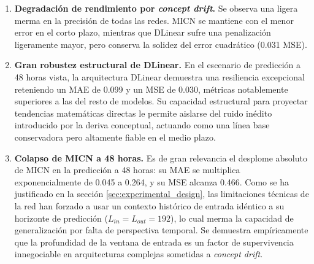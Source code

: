 \begin{enumerate}
	\item \textbf{Degradación de rendimiento por \textit{concept drift}.}
	Se observa  una ligera merma en la  precisión de todas las redes. MICN se mantiene con el menor error en el corto plazo, mientras que DLinear sufre una penalización ligeramente mayor, pero conserva la solidez del error cuadrático (0.031 MSE).
	
	\item \textbf{Gran robustez estructural de DLinear.}
	En el escenario de predicción a 48 horas vista, la arquitectura DLinear demuestra una resiliencia excepcional reteniendo un MAE de 0.099 y un MSE de 0.030, métricas notablemente superiores a las del resto de modelos. Su capacidad estructural para proyectar tendencias matemáticas directas le permite aislarse del ruido inédito introducido por la deriva conceptual, actuando como una línea base conservadora pero altamente fiable en el medio plazo. 
	
	\item \textbf{Colapso de MICN a 48 horas.}
	Es de gran relevancia el desplome absoluto de MICN en la predicción a 48 horas: su MAE se multiplica exponencialmente de 0.045 a 0.264, y su MSE alcanza 0.466. Como se ha justificado en la sección \ref{sec:experimental_design}, las limitaciones técnicas de la red han forzado a usar un contexto histórico de entrada idéntico a su horizonte de predicción ($L_{in} = L_{out} = 192$), lo cual merma la capacidad de generalización por falta de perspectiva temporal. Se demuestra empíricamente que la profundidad de la ventana de entrada es un factor de supervivencia innegociable en arquitecturas complejas sometidas a \textit{concept drift}.
\end{enumerate}